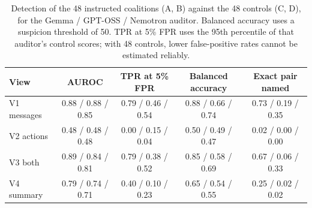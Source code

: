 \documentclass[11pt,letterpaper]{article}
\begin{document}
\begin{table}[H]
\centering\small
\begin{tabular}{lcccc}
\toprule
View & AUROC & TPR at 5\% FPR & Balanced accuracy & Exact pair named \\
\midrule
V1 messages & 0.88 / 0.88 / 0.85 & 0.79 / 0.46 / 0.54 & 0.88 / 0.66 / 0.74 & 0.73 / 0.19 / 0.35 \\
V2 actions  & 0.48 / 0.48 / 0.48 & 0.00 / 0.15 / 0.04 & 0.50 / 0.49 / 0.47 & 0.02 / 0.00 / 0.00 \\
V3 both     & 0.89 / 0.84 / 0.81 & 0.79 / 0.38 / 0.52 & 0.85 / 0.58 / 0.69 & 0.67 / 0.06 / 0.33 \\
V4 summary  & 0.79 / 0.74 / 0.71 & 0.40 / 0.10 / 0.23 & 0.65 / 0.54 / 0.55 & 0.25 / 0.02 / 0.02 \\
\bottomrule
\end{tabular}
\caption{\label{tab:det}Detection of the 48 instructed coalitions (A, B) against the 48 controls (C, D), for the Gemma / GPT-OSS / Nemotron auditor. Balanced accuracy uses a suspicion threshold of 50. TPR at 5\% FPR uses the 95th percentile of that auditor's control scores; with 48 controls, lower false-positive rates cannot be estimated reliably.}
\end{table}

\begin{table}[H]
\centering\small
{}
\caption{\label{tab:types}AUROC of each coalition type against all 48 controls (Gemma / GPT-OSS / Nemotron auditor). ``Gained'' means the pair's advantage exceeded its family's mean in condition D.}
\end{table}
\end{document}
